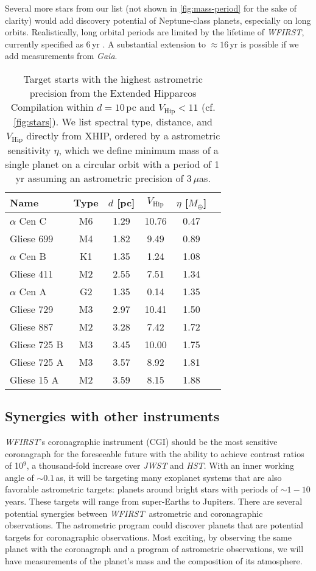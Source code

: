 \documentclass[modern, times]{aastex61}
\newcommand\wfirst{\textit{WFIRST}}
\newcommand\gaia{\textit{Gaia}}
\begin{document}
Several more stars from our list (not shown in \autoref{fig:mass-period} for the sake of clarity) would add discovery potential of Neptune-class planets, especially on long orbits. 
Realistically, long orbital periods are limited by the lifetime of \wfirst, currently specified as 6\,yr \citep{Spergel2015}. 
A substantial extension to $\approx16\,$yr is possible if we add measurements from \gaia.

\begin{table}[t]
\caption{Target starts with the highest astrometric precision from the Extended Hipparcos Compilation within $d=10\,$pc and $V_\mathrm{Hip} < 11$ (cf. \autoref{fig:stars}).
We list spectral type, distance, and $V_\mathrm{Hip}$ directly from XHIP, ordered by a astrometric sensitivity $\eta$, which we define minimum mass of a single planet on a circular orbit with a period of 1\,yr assuming an astrometric precision of 3\,$\mu$as.}
\label{tab:targets}
\begin{tabular}{lccccc}
\hline\hline
Name & Type & $d$ [pc] & $V_\mathrm{Hip}$ & $\eta$ [$M_\oplus$]\\
\hline
$\alpha$ Cen C & M6 & 1.29 & 10.76 & 0.47 \\
Gliese 699 & M4 & 1.82 & 9.49 & 0.89\\
$\alpha$ Cen B & K1 & 1.35 & 1.24 & 1.08\\
Gliese 411 & M2 & 2.55 & 7.51 & 1.34\\
$\alpha$ Cen A & G2 & 1.35 & 0.14 & 1.35\\
Gliese 729 & M3 & 2.97 & 10.41 & 1.50\\
Gliese 887 & M2 & 3.28 & 7.42 & 1.72\\
Gliese 725 B & M3 & 3.45 & 10.00 & 1.75\\
Gliese 725 A & M3 & 3.57 & 8.92 & 1.81\\
Gliese 15 A & M2 & 3.59 & 8.15 & 1.88\\
\hline
\end{tabular}
\end{table}

\subsection{Synergies with other instruments}

\wfirst's coronagraphic instrument (CGI)  should be the most sensitive coronagraph for the foreseeable future with the ability to achieve contrast ratios of 10$^9$, a thousand-fold increase over {\it JWST} and {\it HST}.  With an inner working angle of $\sim 0.1$\,as, it will be targeting many exoplanet systems that are also favorable astrometric targets: planets around bright stars with periods of $\sim 1-10$ years.  These targets will range from super-Earths to Jupiters.  There are several potential synergies between \wfirst\ astrometric and coronagraphic observations.  The astrometric program could discover planets that are potential targets for coronagraphic observations.  Most exciting, by observing the same planet with the coronagraph and a program of astrometric observations, we will have measurements of the planet's mass and the composition of its atmosphere.
\end{document}
